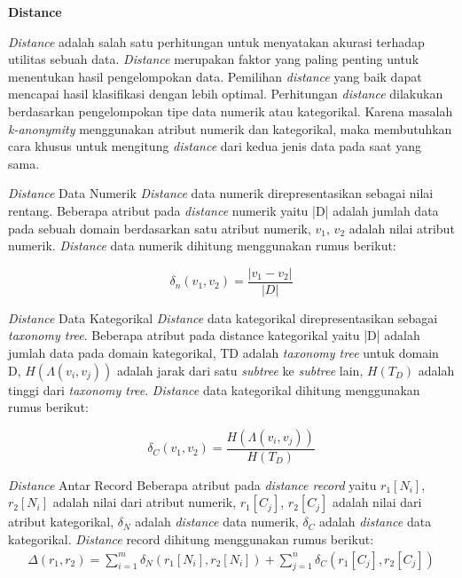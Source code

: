 \documentclass[a4paper,twoside]{article}
\begin{document}
\begin{enumerate}
\textbf{Distance} 

\textit{Distance} adalah salah satu perhitungan untuk menyatakan akurasi terhadap utilitas sebuah data. \textit{Distance} merupakan faktor yang paling penting untuk menentukan hasil pengelompokan data. Pemilihan \textit{distance} yang baik dapat mencapai hasil klasifikasi dengan lebih optimal. Perhitungan \textit{distance} dilakukan berdasarkan pengelompokan tipe data numerik atau kategorikal. Karena masalah \textit{k-anonymity} menggunakan atribut numerik dan kategorikal, maka membutuhkan cara khusus untuk mengitung \textit{distance} dari kedua jenis data pada saat yang sama. 

\textit{Distance} Data Numerik
\textit{Distance} data numerik direpresentasikan sebagai nilai rentang. Beberapa atribut pada \textit{distance} numerik yaitu |D| adalah jumlah data pada sebuah domain berdasarkan satu atribut numerik, $v_1$, $v_2$ adalah nilai atribut numerik. \textit{Distance} data numerik dihitung menggunakan rumus berikut:

\begin{equation}
\delta_n(v_1,v_2) = \frac{|v_1 - v_2|}{|D|} 
\end{equation}

\textit{Distance} Data Kategorikal
\textit{Distance} data kategorikal direpresentasikan sebagai \textit{taxonomy tree}. Beberapa atribut pada distance kategorikal yaitu |D| adalah jumlah data pada domain kategorikal, TD adalah \textit{taxonomy tree} untuk domain D,  $H(\Lambda(v_i,v_j))$ adalah jarak dari satu \textit{subtree} ke \textit{subtree} lain, $H(T_D)$ adalah tinggi dari \textit{taxonomy tree}. \textit{Distance} data kategorikal dihitung menggunakan rumus berikut:

\begin{equation}
\delta_C(v_1,v_2) = \frac{H(\Lambda(v_i,v_j))}{H(T_D)} 
\end{equation}

\textit{Distance} Antar Record
Beberapa atribut pada \textit{distance record} yaitu $r_1[N_i]$, $r_2[N_i]$ adalah nilai dari atribut numerik, $r_1[C_j]$, $r_2[C_j]$ adalah nilai dari atribut kategorikal, $\delta_N$ adalah \textit{distance} data numerik, $\delta_C$ adalah \textit{distance} data kategorikal. \textit{Distance} record dihitung menggunakan rumus berikut:
\begin{align}
\Delta (r_1,r_2) = \sum_{i=1}^{m} \delta_N(r_1[N_i],r_2	[N_i]) +  \sum_{j=1}^{n} \delta_C(r_1[C_j],r_2[C_j])
\end{align}



\end{enumerate}
\end{document}
